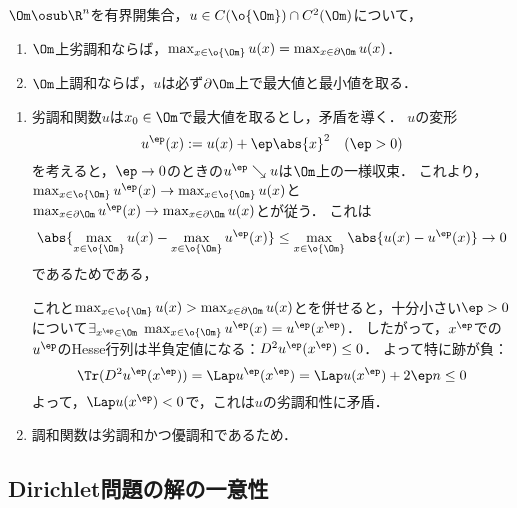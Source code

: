 \documentclass[uplatex,dvipdfmx]{jsreport}
\begin{document}
\begin{theorem}
    $\Om\osub\R^n$を有界開集合，$u\in C(\o{\Om})\cap C^2(\Om)$について，
    \begin{enumerate}
        \item $\Om$上劣調和ならば，$\max_{x\in\o{\Om}}u(x)=\max_{x\in\partial\Om}u(x)$．
        \item $\Om$上調和ならば，$u$は必ず$\partial\Om$上で最大値と最小値を取る．
    \end{enumerate}
\end{theorem}
\begin{Proof}\mbox{}
    \begin{enumerate}
        \item 劣調和関数$u$は$x_0\in\Om$で最大値を取るとし，矛盾を導く．
        $u$の変形
        \[u^\ep(x):=u(x)+\ep\abs{x}^2\quad(\ep>0)\]
        を考えると，$\ep\to0$のときの$u^\ep\searrow u$は$\Om$上の一様収束．
        これより，$\max_{x\in\o{\Om}}u^\ep(x)\to\max_{x\in\o{\Om}}u(x)$と$\max_{x\in\partial\Om}u^\ep(x)\to\max_{x\in\partial\Om}u(x)$とが従う．
        これは
        \[\abs{\max_{x\in\o{\Om}}u(x)-\max_{x\in\o{\Om}}u^\ep(x)}\le\max_{x\in\o{\Om}}\abs{u(x)-u^\ep(x)}\to0\]
        であるためである，
        
        これと$\max_{x\in\o{\Om}}u(x)>\max_{x\in\partial\Om}u(x)$とを併せると，十分小さい$\ep>0$について$\exists_{x^\ep\in\Om}\;\max_{x\in\o{\Om}}u^\ep(x)=u^\ep(x^\ep)$．
        したがって，$x^\ep$での$u^\ep$のHesse行列は半負定値になる：$D^2u^\ep(x^\ep)\le0$．
        よって特に跡が負：
        \[\Tr(D^2u^\ep(x^\ep))=\Lap u^\ep(x^\ep)=\Lap u(x^\ep)+2\ep n\le0\]
        よって，$\Lap u(x^\ep)<0$で，これは$u$の劣調和性に矛盾．
        \item 調和関数は劣調和かつ優調和であるため．
    \end{enumerate}
\end{Proof}

\subsection{Dirichlet問題の解の一意性}
\end{document}
